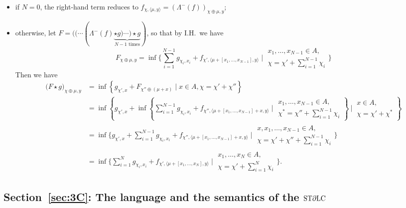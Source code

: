 \begin{enumerate}
\begin{itemize}
\item if $N=0$, the right-hand term reduces to 
$f_{\chi, \langle \mu, y\rangle}=(\Lambda^{-}(f))_{\chi\oplus\mu,y}$;

\item otherwise, let $F=(( \cdots (\Lambda^{-}(f) \underbrace{\star g)\cdots )\star g}_{N-1\text{ times}})$, so that by I.H.~we have
$$
F_{\chi\oplus\mu,y}=
\inf\Big \{ 
\sum_{i=1}^{N-1}g_{\chi_{i},x_{i}}+
f_{\chi', \langle\mu+ [x_{1},\dots, x_{N-1}],y\rangle}
\mid 
\begin{matrix}
x_{1},\dots, x_{N-1}\in A,\\
\chi= \chi'+\sum_{i=1}^{N-1}\chi_{i}
\end{matrix}
\Big \}
$$
Then we have
{\small
\begin{align*}
\big( F\star g\big)_{\chi\oplus\mu,y}
&=
\inf \left \{
g_{\chi',x}+F_{\chi''\oplus(\mu+x)}
\mid
x\in A, \chi=\chi'+\chi''
\right\}\\
&=
\inf\left \{ 
g_{\chi',x}+
\inf\left\{
\sum_{i=1}^{N-1}g_{\chi_{i},x_{i}}+
f_{\chi'', \langle\mu+ [x_{1},\dots, x_{N-1}]+x,y\rangle}
\mid 
\begin{matrix}
x_{1},\dots, x_{N-1}\in A,\\
\chi^{*}= \chi''+\sum_{i=1}^{N-1}\chi_{i}
\end{matrix}
\right\}
\ 
\Big\vert \ 
\begin{matrix}
x\in A,\\
\chi=\chi'+\chi^{*}
\end{matrix}
\right \}\\
&=
\inf\Big \{ 
g_{\chi',x}+
\sum_{i=1}^{N-1}g_{\chi_{i},x_{i}}+
f_{\chi'', \langle\mu+ [x_{1},\dots, x_{N-1}]+x,y\rangle}
\mid 
\begin{matrix}
x,x_{1},\dots, x_{N-1}\in A,\\
\chi= \chi'+\chi''+\sum_{i=1}^{N-1}\chi_{i}
\end{matrix}
\Big \}\\
&=
\inf\Big \{ 
\sum_{i=1}^{N}g_{\chi_{i},x_{i}}+
f_{\chi', \langle\mu+ [x_{1},\dots, x_{N}],y\rangle}
\mid 
\begin{matrix}
x_{1},\dots, x_{N}\in A,\\
\chi= \chi'+\sum_{i=1}^{N}\chi_{i}
\end{matrix}
\Big \}.
\end{align*}
}
\end{itemize}
\end{enumerate}

\subsection{Section~\ref{sec:3C}: The language and the semantics of the $\mathrm{ST}\partial\mathrm{LC}$}\label{secApp:STDLC}

